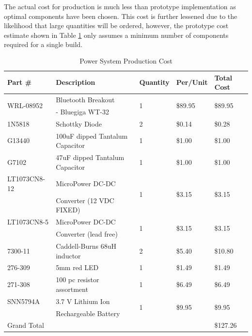 The actual cost for production is much less than prototype implementation as optimal components have been chosen. This cost is further lessened due to the likelihood that large quantities will be ordered, however, the prototype cost estimate shown in Table \ref{tab:power_prod_cost_est} only assumes a minimum number of components required for a single build.

\begin{table}[bhp]
\caption[Production Cost]{Power System Production Cost \cite{web:caddell-burns-price} \cite{web:cap-price} \cite{web:batt-price}}
\small
\centering
\begin{tabular}{l|l|l|l|l}
\setlength{\tabcolsep}{1pt}
    Part \# & Description &   Quantity &   Per/Unit & Total Cost \\\hline

\multirow{2}{*}{WRL-08952}  & Bluetooth Breakout & \multirow{2}{*}{1} & \multirow{2}{*}{\$89.95} & \multirow{2}{*}{\$89.95} \\
		   & - Bluegiga WT-32  &          &   &     \\
    1N5818 & Schottky Diode &          2 &     \$0.14 &     \$0.28 \\

    G13440 & 100uF dipped Tantalum Capacitor &          1 &     \$1.00 &     \$1.00 \\

     G7102 & 47uF dipped Tantalum Capacitor &          1 &     \$1.00 &     \$1.00 \\

LT1073CN8-12  & MicroPower DC-DC 		 & \multirow{2}{*}{1} & \multirow{2}{*}{\$3.15} & \multirow{2}{*}{\$3.15} \\
			 &	Converter (12 VDC FIXED) &          &      &      \\
LT1073CN8-5  & MicroPower DC-DC 		 & \multirow{2}{*}{1} & \multirow{2}{*}{\$3.15} & \multirow{2}{*}{\$3.15} \\
			 & Converter (lead free) &           &   &  \\

   7300-11 & Caddell-Burns 68uH inductor &          2 &     \$5.40 &    \$10.80 \\

   276-309 & 5mm red LED &          1 &     \$1.49 &     \$1.49 \\

   271-308 & 100 pc resistor assortment &          1 &     \$6.49 &     \$6.49 \\

  SNN5794A & 3.7 V Lithium Ion  & \multirow{2}{*}{1} & \multirow{2}{*}{\$9.95} &\multirow{2}{*}{\$9.95} \\
		   & Rechargeable Battery &    &   & \\
  Grand Total & & & & \$127.26\\

\end{tabular}  
\label{tab:power_prod_cost_est}
\end{table}
